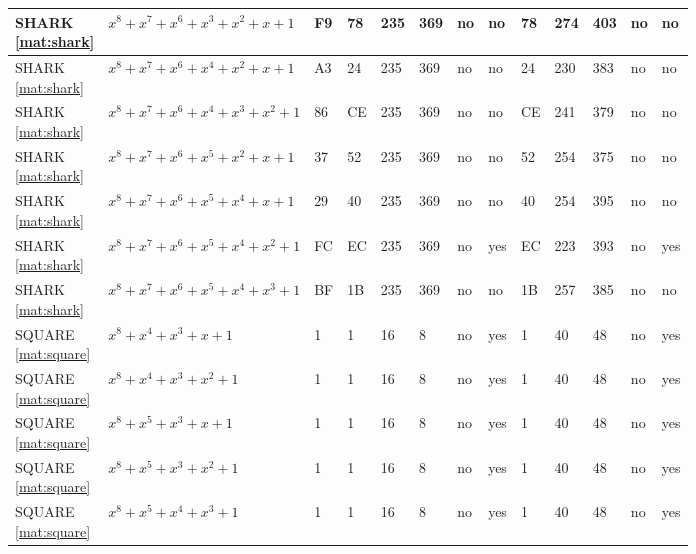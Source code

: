 \begin{tiny}
\begin{longtable}{|l|l|l|l|l|l|l|l|l|l|l|l|l|}
\shortstack{SHARK \\ \eqref{mat:shark}} & $x^8 + x^7 + x^6 + x^3 + x^2 + x + 1$ & F9 & 78 & 235 & 369 & no & no & 78 & 274 & 403 & no & no \\ \hline
\shortstack{SHARK \\ \eqref{mat:shark}} & $x^8 + x^7 + x^6 + x^4 + x^2 + x + 1$ & A3 & 24 & 235 & 369 & no & no & 24 & 230 & 383 & no & no \\ \hline
\shortstack{SHARK \\ \eqref{mat:shark}} & $x^8 + x^7 + x^6 + x^4 + x^3 + x^2 + 1$ & 86 & CE & 235 & 369 & no & no & CE & 241 & 379 & no & no \\ \hline
\shortstack{SHARK \\ \eqref{mat:shark}} & $x^8 + x^7 + x^6 + x^5 + x^2 + x + 1$ & 37 & 52 & 235 & 369 & no & no & 52 & 254 & 375 & no & no \\ \hline
\shortstack{SHARK \\ \eqref{mat:shark}} & $x^8 + x^7 + x^6 + x^5 + x^4 + x + 1$ & 29 & 40 & 235 & 369 & no & no & 40 & 254 & 395 & no & no \\ \hline
\shortstack{SHARK \\ \eqref{mat:shark}} & $x^8 + x^7 + x^6 + x^5 + x^4 + x^2 + 1$ & FC & EC & 235 & 369 & no & yes & EC & 223 & 393 & no & yes \\ \hline
\shortstack{SHARK \\ \eqref{mat:shark}} & $x^8 + x^7 + x^6 + x^5 + x^4 + x^3 + 1$ & BF & 1B & 235 & 369 & no & no & 1B & 257 & 385 & no & no \\ \hline
\shortstack{SQUARE \\ \eqref{mat:square}} & $x^8 + x^4 + x^3 + x + 1$ & 1 & 1 & 16 & 8 & no & yes & 1 & 40 & 48 & no & yes \\ \hline
\shortstack{SQUARE \\ \eqref{mat:square}} & $x^8 + x^4 + x^3 + x^2 + 1$ & 1 & 1 & 16 & 8 & no & yes & 1 & 40 & 48 & no & yes \\ \hline
\shortstack{SQUARE \\ \eqref{mat:square}} & $x^8 + x^5 + x^3 + x + 1$ & 1 & 1 & 16 & 8 & no & yes & 1 & 40 & 48 & no & yes \\ \hline
\shortstack{SQUARE \\ \eqref{mat:square}} & $x^8 + x^5 + x^3 + x^2 + 1$ & 1 & 1 & 16 & 8 & no & yes & 1 & 40 & 48 & no & yes \\ \hline
\shortstack{SQUARE \\ \eqref{mat:square}} & $x^8 + x^5 + x^4 + x^3 + 1$ & 1 & 1 & 16 & 8 & no & yes & 1 & 40 & 48 & no & yes \\ \hline

\end{longtable}
\end{tiny}

